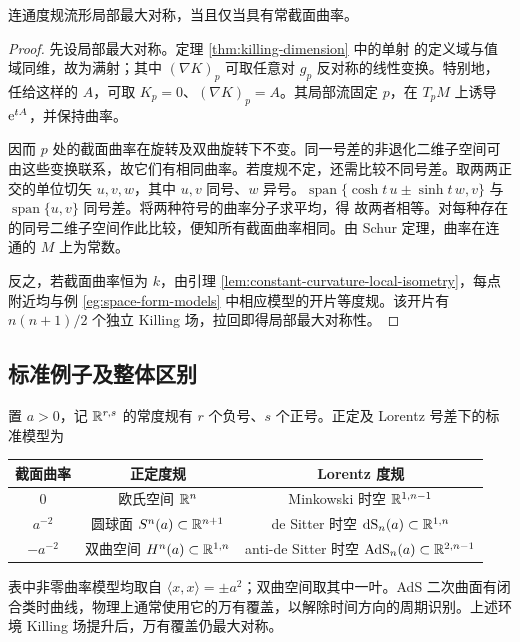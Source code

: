 \begin{theorem}
    连通度规流形局部最大对称，当且仅当具有常截面曲率。
\end{theorem}
\begin{proof}
    先设局部最大对称。定理 \ref{thm:killing-dimension} 中的单射
    的定义域与值域同维，故为满射；其中 $(\nabla K)_p$ 可取任意对 $g_p$ 反对称的线性变换。特别地，任给这样的 $A$，可取 $K_p=0$、$(\nabla K)_p=A$。其局部流固定 $p$，在 $T_pM$ 上诱导 $\mathrm{e}^{tA}$，并保持曲率。

    因而 $p$ 处的截面曲率在旋转及双曲旋转下不变。同一号差的非退化二维子空间可由这些变换联系，故它们有相同曲率。若度规不定，还需比较不同号差。取两两正交的单位切矢 $u,v,w$，其中 $u,v$ 同号、$w$ 异号。$\operatorname{span}\{\cosh t\,u\pm\sinh t\,w,v\}$ 与 $\operatorname{span}\{u,v\}$ 同号差。将两种符号的曲率分子求平均，得
    故两者相等。对每种存在的同号二维子空间作此比较，便知所有截面曲率相同。由 Schur 定理，曲率在连通的 $M$ 上为常数。

    反之，若截面曲率恒为 $k$，由引理 \ref{lem:constant-curvature-local-isometry}，每点附近均与例 \ref{eg:space-form-models} 中相应模型的开片等度规。该开片有 $n(n+1)/2$ 个独立 Killing 场，拉回即得局部最大对称性。
\end{proof}

\subsection{标准例子及整体区别}

置 $a>0$，记 $\mathbb{R}^{r,s}$ 的常度规有 $r$ 个负号、$s$ 个正号。正定及 Lorentz 号差下的标准模型为
\begin{center}
\begin{tabular}{c|c|c}
    截面曲率 & 正定度规 & Lorentz 度规\\\hline
    $0$ & 欧氏空间 $\mathbb{R}^n$ & Minkowski 时空 $\mathbb{R}^{1,n-1}$\\
    $a^{-2}$ & 圆球面 $S^n(a)\subset\mathbb{R}^{n+1}$ & de Sitter 时空 $\mathrm{dS}_n(a)\subset\mathbb{R}^{1,n}$\\
    $-a^{-2}$ & 双曲空间 $H^n(a)\subset\mathbb{R}^{1,n}$ & anti-de Sitter 时空 $\mathrm{AdS}_n(a)\subset\mathbb{R}^{2,n-1}$
\end{tabular}
\end{center}
表中非零曲率模型均取自 $\langle x,x\rangle=\pm a^2$；双曲空间取其中一叶。AdS 二次曲面有闭合类时曲线，物理上通常使用它的万有覆盖，以解除时间方向的周期识别。上述环境 Killing 场提升后，万有覆盖仍最大对称。

